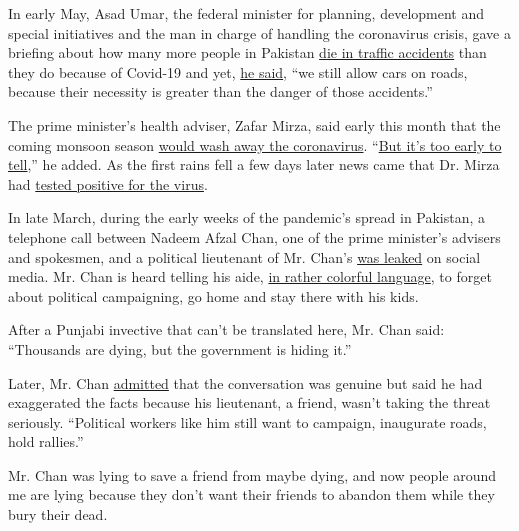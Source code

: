 In early May, Asad Umar, the federal minister for planning, development
and special initiatives and the man in charge of handling the
coronavirus crisis, gave a briefing about how many more people in
Pakistan
\href{https://arynews.tv/en/coronavirus-fatal-other-countries-asad-umar/}{die
in traffic accidents} than they do because of Covid-19 and yet,
\href{https://nayadaur.tv/2020/05/minister-asad-umar-compares-covid-19-to-road-accidents/}{he
said}, ``we still allow cars on roads, because their necessity is
greater than the danger of those accidents.''

The prime minister's health adviser, Zafar Mirza, said early this month
that the coming monsoon season
\href{https://www.samaa.tv/news/2020/07/monsoon-will-decrease-coronavirus-cases-zafar-mirza/}{would
wash away the coronavirus}.
``\href{https://nayadaur.tv/2020/07/monsoon-rains-could-help-mitigate-covid-pandemic-in-pakistan-zafar-mirza/}{But
it's too early to tell},'' he added. As the first rains fell a few days
later news came that Dr. Mirza had
\href{https://www.dawn.com/news/1567337/sapm-dr-zafar-mirza-tests-positive-for-covid-19-says-he-has-mild-symptoms}{tested
positive for the virus}.

In late March, during the early weeks of the pandemic's spread in
Pakistan, a telephone call between Nadeem Afzal Chan, one of the prime
minister's advisers and spokesmen, and a political lieutenant of Mr.
Chan's
\href{https://nayadaur.tv/2020/03/govt-hiding-thousands-of-coronavirus-deaths-says-pms-assistant-in-alleged-audio-clip/}{was
leaked} on social media. Mr. Chan is heard telling his aide,
\href{https://nayadaur.tv/2020/03/govt-hiding-thousands-of-coronavirus-deaths-says-pms-assistant-in-alleged-audio-clip/}{in
rather colorful language}, to forget about political campaigning, go
home and stay there with his kids.

After a Punjabi invective that can't be translated here, Mr. Chan said:
``Thousands are dying, but the government is hiding it.''

Later, Mr. Chan
\href{https://nayadaur.tv/2020/03/govt-hiding-thousands-of-coronavirus-deaths-says-pms-assistant-in-alleged-audio-clip/}{admitted}
that the conversation was genuine but said he had exaggerated the facts
because his lieutenant, a friend, wasn't taking the threat seriously.
``Political workers like him still want to campaign, inaugurate roads,
hold rallies.''

Mr. Chan was lying to save a friend from maybe dying, and now people
around me are lying because they don't want their friends to abandon
them while they bury their dead.


